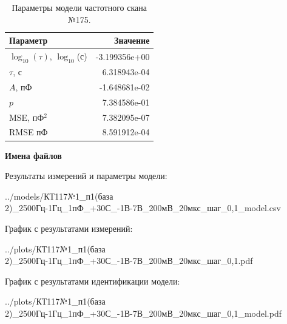 \begin{table}[!ht]
    \centering
    \caption{Параметры модели частотного скана №175.}
    \begin{tabular}{|l|r|}
        \hline
        Параметр                                       & Значение                  \\ \hline
        $\log_{10}(\tau)$, $\log_{10}$(с)              & -3.199356e+00             \\ \hline
        $\tau$, с                                      & 6.318943e-04              \\ \hline
        $A$, пФ                                        & -1.648681e-02             \\ \hline
        $p$                                            & 7.384586e-01              \\ \hline
        MSE, пФ$^2$                                    & 7.382095e-07              \\ \hline
        RMSE пФ                                        & 8.591912e-04              \\ \hline
    \end{tabular}
    \label{table:frequency_scan_model_175}
\end{table}

\textbf{Имена файлов}

Результаты измерений и параметры модели:

\scriptsize../models/КТ117№1\_п1(база 2)\_2500Гц-1Гц\_1пФ\_+30С\_-1В-7В\_200мВ\_20мкс\_шаг\_0,1\_model.csv
\normalsize

График с результатами измерений:

\scriptsize../plots/КТ117№1\_п1(база 2)\_2500Гц-1Гц\_1пФ\_+30С\_-1В-7В\_200мВ\_20мкс\_шаг\_0,1.pdf
\normalsize

График с результатами идентификации модели:

\scriptsize../plots/КТ117№1\_п1(база 2)\_2500Гц-1Гц\_1пФ\_+30С\_-1В-7В\_200мВ\_20мкс\_шаг\_0,1\_model.pdf
\normalsize

